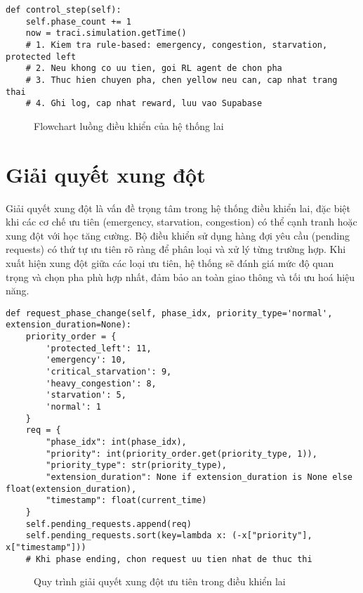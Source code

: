 \begin{lstlisting}[style=py,caption={Luồng điều khiển trong hàm control\_step}]
def control_step(self):
    self.phase_count += 1
    now = traci.simulation.getTime()
    # 1. Kiem tra rule-based: emergency, congestion, starvation, protected left
    # 2. Neu khong co uu tien, goi RL agent de chon pha
    # 3. Thuc hien chuyen pha, chen yellow neu can, cap nhat trang thai
    # 4. Ghi log, cap nhat reward, luu vao Supabase
\end{lstlisting}

\begin{figure}[H]
    \centering
    \caption{Flowchart luồng điều khiển của hệ thống lai}
    \label{fig:hybrid_control_flow}
\end{figure}

\section{Giải quyết xung đột}

Giải quyết xung đột là vấn đề trọng tâm trong hệ thống điều khiển lai, đặc biệt khi các cơ chế ưu tiên (emergency, starvation, congestion) có thể cạnh tranh hoặc xung đột với học tăng cường. Bộ điều khiển sử dụng hàng đợi yêu cầu (pending requests) có thứ tự ưu tiên rõ ràng để phân loại và xử lý từng trường hợp. Khi xuất hiện xung đột giữa các loại ưu tiên, hệ thống sẽ đánh giá mức độ quan trọng và chọn pha phù hợp nhất, đảm bảo an toàn giao thông và tối ưu hoá hiệu năng.

\begin{lstlisting}[style=py,caption={Xử lý giải quyết xung đột bằng pending\_requests}]
def request_phase_change(self, phase_idx, priority_type='normal', extension_duration=None):
    priority_order = {
        'protected_left': 11,
        'emergency': 10,
        'critical_starvation': 9,
        'heavy_congestion': 8,
        'starvation': 5,
        'normal': 1
    }
    req = {
        "phase_idx": int(phase_idx),
        "priority": int(priority_order.get(priority_type, 1)),
        "priority_type": str(priority_type),
        "extension_duration": None if extension_duration is None else float(extension_duration),
        "timestamp": float(current_time)
    }
    self.pending_requests.append(req)
    self.pending_requests.sort(key=lambda x: (-x["priority"], x["timestamp"]))
    # Khi phase ending, chon request uu tien nhat de thuc thi
\end{lstlisting}

\begin{figure}[H]
    \centering
    \caption{Quy trình giải quyết xung đột ưu tiên trong điều khiển lai}
    \label{fig:hybrid_conflict_resolution}
\end{figure}